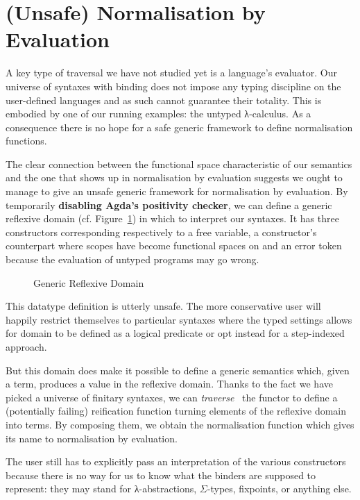 \section{(Unsafe) Normalisation by Evaluation}\label{section:unsafenbyeval}

A key type of traversal we have not studied yet is a language's
evaluator. Our universe of syntaxes with binding does not impose
any typing discipline on the user-defined languages and as such
cannot guarantee their totality. This is embodied by one of our running
examples: the untyped λ-calculus. As a consequence there
is no hope for a safe generic framework to define normalisation
functions.

The clear connection between the  functional space
characteristic of our semantics and the one that shows up in
normalisation by evaluation suggests we ought to manage to
give an unsafe generic framework for normalisation by evaluation.
By temporarily \textbf{disabling Agda's positivity checker},
we can define a generic reflexive domain 
(cf. Figure~\ref{fig:reflexivedomain}) in which to
interpret our syntaxes. It has three constructors corresponding
respectively to a free variable, a constructor's counterpart where
scopes have become  functional spaces on  and
an error token because the evaluation of untyped programs may go wrong.

\begin{figure}[h]
\caption{Generic Reflexive Domain}\label{fig:reflexivedomain}
\end{figure}

This datatype definition is utterly unsafe. The more conservative
user will happily restrict themselves to particular syntaxes where
the typed settings allows for domain to be defined as a logical
predicate or opt instead for a step-indexed approach.

But this domain does make it possible to define a generic 
semantics which, given a term, produces a value in the reflexive
domain. Thanks to the fact we have picked a universe of finitary syntaxes, we
can \emph{traverse}~\cite{mcbride_paterson_2008,DBLP:journals/jfp/GibbonsO09}
the functor to define
a (potentially failing) reification function turning elements of the
reflexive domain into terms. By composing them, we obtain the
normalisation function which gives its name to normalisation by
evaluation.

The user still has to explicitly pass an interpretation of
the various constructors because there is no way for us to
know what the binders are supposed to represent: they may
stand for λ-abstractions, $\Sigma$-types, fixpoints, or
anything else.

